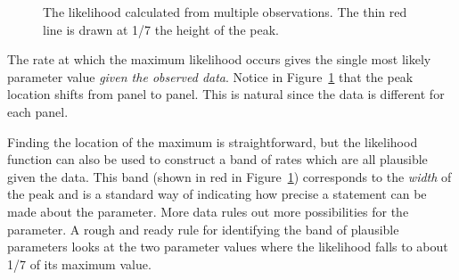 \documentclass[
  letterpaper,
  DIV=11,
  numbers=noendperiod,
  oneside]{scrartcl}
\begin{document}
\begin{figure}
\begin{minipage}{\linewidth}
\end{minipage}%
\newline
\begin{minipage}{\linewidth}



\end{minipage}%

\caption{\label{fig-narrowing-likelihood}The likelihood calculated from
multiple observations. The thin red line is drawn at 1/7 the height of
the peak.}

\end{figure}%

The rate at which the maximum likelihood occurs gives the single most
likely parameter value \emph{given the observed data}. Notice in
Figure~\ref{fig-narrowing-likelihood} that the peak location shifts from
panel to panel. This is natural since the data is different for each
panel.

Finding the location of the maximum is straightforward, but the
likelihood function can also be used to construct a band of rates which
are all plausible given the data. This band (shown in red in
Figure~\ref{fig-narrowing-likelihood}) corresponds to the \emph{width}
of the peak and is a standard way of indicating how precise a statement
can be made about the parameter. More data rules out more possibilities
for the parameter. A rough and ready rule for identifying the band of
plausible parameters looks at the two parameter values where the
likelihood falls to about 1/7 of its maximum value.
{}
\end{document}
